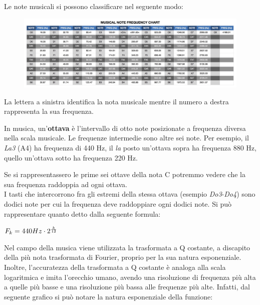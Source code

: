 Le note musicali si possono classificare nel seguente modo:
\begin{figure}[H]
	\centering
	\includegraphics[scale=0.15]{./images/img4.jpg}
\end{figure}
La lettera a sinistra identifica la nota musicale mentre il numero a destra rappresenta la sua frequenza.

In musica, un'\textbf{ottava} è l'intervallo di otto note posizionate a frequenza diversa nella scala musicale. Le frequenze intermedie sono altre sei note. Per esempio, il \textit{La3} (A4) ha frequenza di 440 Hz, il \textit{la} posto un'ottava sopra ha frequenza 880 Hz, quello un'ottava sotto ha frequenza 220 Hz.

Se si rappresentassero le prime sei ottave della nota C potremmo vedere che la sua frequenza raddoppia ad ogni ottava. \\
\newline
I tasti che intercorrono fra gli estremi della stessa ottava (esempio \textit{Do3}-\textit{Do4}) sono dodici note per cui la frequenza deve raddoppiare ogni dodici note. Si può rappresentare quanto detto dalla seguente formula: \\

\begin{center}
	\begin{math}
		F_{k}=440Hz \cdot 2^{k \over 12}
	\end{math}
\end{center}
Nel campo della musica viene utilizzata la trasformata a Q costante, a discapito della più nota trasformata di Fourier, proprio per la sua natura esponenziale. Inoltre, l'accuratezza della trasformata a Q costante è analoga alla scala logaritmica e imita l'orecchio umano, avendo una risoluzione di frequenza più alta a quelle più basse e una risoluzione più bassa alle frequenze più alte. Infatti, dal seguente grafico si può notare la natura esponenziale della funzione:
\begin{center}
\end{center}